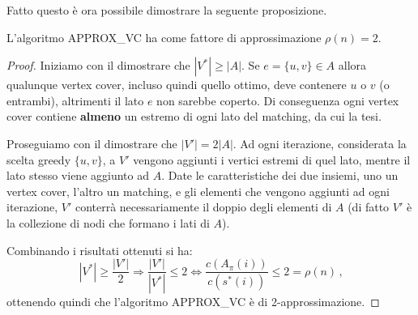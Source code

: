 Fatto questo è ora possibile dimostrare la seguente proposizione.

\begin{proposizione}
L'algoritmo APPROX\_VC ha come fattore di approssimazione $\rho (n)=2$.
\end{proposizione}
\begin{proof}
Iniziamo con il dimostrare che $|V^*| \geq |A|$. Se $e=\{u,v\}\in A$ allora qualunque vertex cover, incluso quindi quello ottimo, deve contenere $u$ o $v$ (o entrambi), altrimenti il lato $e$ non sarebbe coperto. Di conseguenza ogni vertex cover contiene \textbf{almeno} un estremo di ogni lato del matching, da cui la tesi.

Proseguiamo con il dimostrare che $|V'|=2|A|$. Ad ogni iterazione, considerata la scelta greedy $\{u,v\}$, a $V'$ vengono aggiunti i vertici estremi di quel lato, mentre il lato stesso viene aggiunto ad $A$. Date le caratteristiche dei due insiemi, uno un vertex cover, l'altro un matching, e gli elementi che vengono aggiunti ad ogni iterazione, $V'$ conterrà necessariamente il doppio degli elementi di $A$ (di fatto $V'$ è la collezione di nodi che formano i lati di $A$).

Combinando i risultati ottenuti si ha:
\[
|V^*| \geq \frac{|V'|}{2} \Rightarrow \frac{|V'|}{|V^*|} \leq 2 \Leftrightarrow \frac{c(A_\pi (i))}{c(s^*(i))} \leq 2 = \rho (n) \, \mbox{,}
\]
ottenendo quindi che l'algoritmo APPROX\_VC è di 2-approssimazione.
\end{proof}


